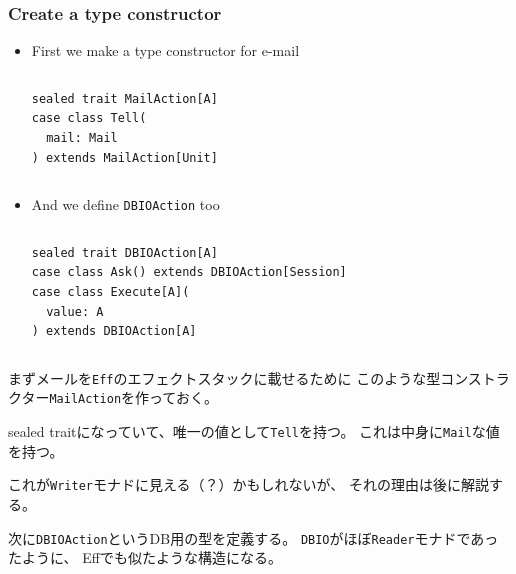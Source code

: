 \begin{frame}[fragile]
  \frametitle{Create a type constructor}

  \begin{itemize}
    \item First we make a type constructor for e-mail
    \begin{columns}
      \begin{column}{0.45\textwidth}
\begin{lstlisting}[style=scala]
sealed trait MailAction[A]
case class Tell(
  mail: Mail
) extends MailAction[Unit]
\end{lstlisting}
      \end{column}
      \begin{column}{0.55\textwidth}
      \end{column}
    \end{columns}

    \item And we define \lstinline|DBIOAction| too
    \begin{columns}
      \begin{column}{0.45\textwidth}
\begin{lstlisting}[style=scala]
sealed trait DBIOAction[A]
case class Ask() extends DBIOAction[Session]
case class Execute[A](
  value: A
) extends DBIOAction[A]
\end{lstlisting}
      \end{column}
      \begin{column}{0.55\textwidth}
      \end{column}
    \end{columns}
  \end{itemize}

  \begin{notes}
    \item まずメールを\lstinline|Eff|のエフェクトスタックに載せるために
    このような型コンストラクター\lstinline|MailAction|を作っておく。

    \item sealed traitになっていて、唯一の値として\lstinline|Tell|を持つ。
    これは中身に\lstinline|Mail|な値を持つ。

    \item これが\lstinline|Writer|モナドに見える（？）かもしれないが、
    それの理由は後に解説する。

    
    \item 次に\lstinline|DBIOAction|というDB用の型を定義する。
    \lstinline|DBIO|がほぼ\lstinline|Reader|モナドであったように、
    Effでも似たような構造になる。
  \end{notes}
\end{frame}

